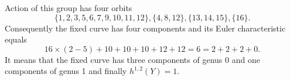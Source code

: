 \documentclass[a4paper]{amsart}
\theoremstyle{plain}
\theoremstyle{definition}
\theoremstyle{remark}
\numberwithin{equation}{section}
\begin{document}
Action of this group has four orbits
\[\{1,2,3,5,6,7,9,10,11,12\}, \{4,8,12\}, \{13,14,15\}, \{16\}.\]
Consequently the fixed curve has four components and its Euler characteristic equals
\[16\times(2-5)+10+10+10+12+12 = 6 = 2+2+2+0.\]
It means that the fixed curve has three components of genus 0 and one components of genus 1 and finally $h^{1,2}(Y)=1$.


%
%
%
%
%
%
%
%
%
%
%
%
%
%
%
%
%
%
%
%
%
%
%
%
%
%
%
%
%
%
\end{document}
